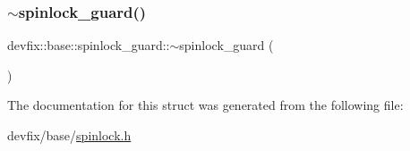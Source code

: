\mbox{\label{structdevfix_1_1base_1_1spinlock__guard_ae1fd374a37a2f7344dd16468270d7b5b}} 
\subsubsection{\texorpdfstring{$\sim$spinlock\+\_\+guard()}{~spinlock\_guard()}}
{\footnotesize\ttfamily devfix\+::base\+::spinlock\+\_\+guard\+::$\sim$spinlock\+\_\+guard (\begin{DoxyParamCaption}{ }\end{DoxyParamCaption})\hspace{0.3cm}{\ttfamily [inline]}}



The documentation for this struct was generated from the following file\+:\begin{DoxyCompactItemize}
\item 
devfix/base/\hyperlink{spinlock_8h}{spinlock.\+h}\end{DoxyCompactItemize}
